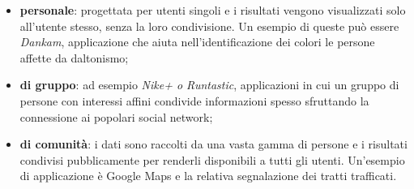 \begin{itemize}
\item \textbf{personale}: progettata per utenti singoli e i risultati vengono visualizzati solo all'utente stesso, senza la loro condivisione. Un esempio di queste può essere \emph{Dankam}, applicazione che aiuta nell'identificazione dei colori le persone affette da daltonismo;
\item \textbf{di gruppo}: ad esempio \emph{Nike+ o Runtastic}, applicazioni in cui un gruppo di persone con interessi affini condivide informazioni spesso sfruttando la connessione ai popolari social network;
\item \textbf{di comunità}: i dati sono raccolti da una vasta gamma di persone e i risultati condivisi pubblicamente per renderli disponibili a tutti gli utenti. Un'esempio di applicazione è Google Maps e la relativa segnalazione dei tratti trafficati.
\end{itemize}
